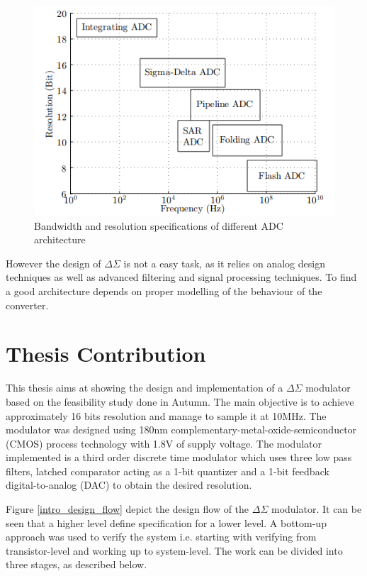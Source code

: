 \begin{figure}[H]
\centering
\includegraphics[scale = 0.7]{images/compare_adc.png}
\caption{Bandwidth and resolution specifications of different ADC architecture}
\label{comp_asdc}
\end{figure}

However the design of $\Delta\Sigma$ is not a easy task, as it relies on analog design techniques as well as advanced filtering and signal  processing techniques. To find a good architecture depends on proper modelling of the behaviour of the converter. 

\section{Thesis Contribution}
This thesis aims at showing the design and implementation of a $\Delta\Sigma$ modulator based on the feasibility study done in Autumn. The main objective is to achieve approximately 16 bits resolution and manage to sample it at 10MHz. The modulator was designed using 180nm complementary-metal-oxide-semiconductor (CMOS) process technology with 1.8V of supply voltage. The modulator implemented is a third order discrete time modulator which uses three low pass filters, latched comparator acting as a 1-bit quantizer and a 1-bit feedback digital-to-analog (DAC) to obtain the desired resolution. 

Figure \ref{intro_design_flow} depict the design flow of the $\Delta\Sigma$ modulator. It can be seen that a higher level define specification for a lower level. A bottom-up approach was used to verify the system i.e. starting with verifying from transistor-level and working up to system-level. The work can be divided into three stages, as described below.  



